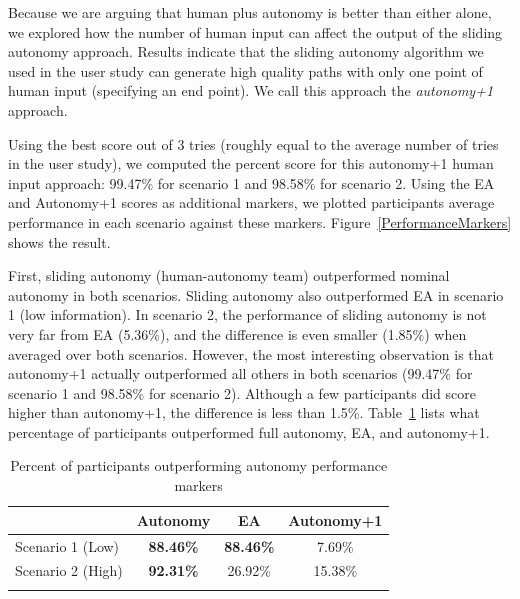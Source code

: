 \documentclass[lettersize, apacite, twoside, HRI]{apa_HRI}
\begin{document}
Because we are arguing that human plus autonomy is better than either alone, we explored how the number of human input can affect the output of the sliding autonomy approach. Results indicate that the sliding autonomy algorithm we used in the user study can generate high quality paths with only one point of human input (specifying an end point). We call this approach the \textit{autonomy+1} approach.

Using the best score out of 3 tries (roughly equal to the average number of tries in the user study), we computed the percent score for this autonomy+1 human input approach: 99.47\% for scenario 1 and 98.58\% for scenario 2. Using the EA and Autonomy+1 scores as additional markers, we plotted participants average performance in each scenario against these markers. Figure~\ref{PerformanceMarkers} shows the result.

First, sliding autonomy (human-autonomy team) outperformed nominal autonomy in both scenarios. Sliding autonomy also outperformed EA in scenario 1 (low information). In scenario 2, the performance of sliding autonomy is not very far from EA (5.36\%), and the difference is even smaller (1.85\%) when averaged over both scenarios. However, the most interesting observation is that autonomy+1 actually outperformed all others in both scenarios (99.47\% for scenario 1 and 98.58\% for scenario 2). Although a few participants did score higher than autonomy+1, the difference is less than 1.5\%. Table~\ref{CompareToMarkers} lists what percentage of participants outperformed full autonomy, EA, and autonomy+1.

\begin{table}
\caption{Percent of participants outperforming autonomy performance markers}
	\centering
		\begin{tabular}
			{|l|c|c|c|}
			\hline
			 & Autonomy & EA & Autonomy+1 \\
			\hline
			Scenario 1 (Low) & \textbf{88.46\%} & \textbf{88.46\%} & 7.69\% \\
			\hline
			Scenario 2 (High) & \textbf{92.31\%} & 26.92\% & 15.38\% \\
			\hline
			\multicolumn{4}{c}{}  %
		\end{tabular}
\label{CompareToMarkers}
\end{table}
\end{document}
